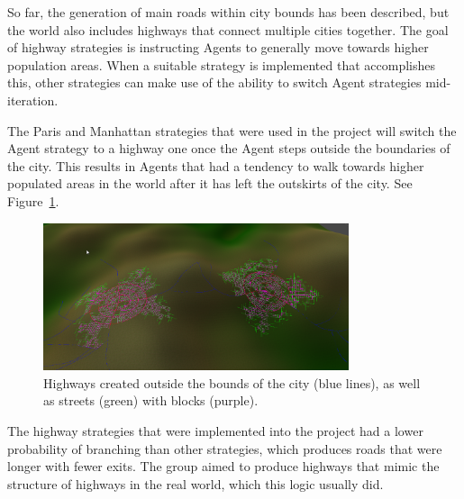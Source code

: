 So far, the generation of main roads within city bounds has been described, but the world also includes highways that connect multiple cities together.
The goal of highway strategies is instructing Agents to generally move towards higher population areas.
When a suitable strategy is implemented that accomplishes this, other strategies can make use of the ability to switch Agent strategies mid-iteration.

The Paris and Manhattan strategies that were used in the project will switch the Agent strategy to a highway one once the Agent steps outside the boundaries of the city.
This results in Agents that had a tendency to walk towards higher populated areas in the world after it has left the outskirts of the city.
See Figure~\ref{fig:road_highways}.

\begin{figure}[H]
  \centering

  \includegraphics[width=0.8\textwidth]{figure/road_highways.png}
  \caption{Highways created outside the bounds of the city (blue lines), as well as streets (green) with blocks (purple).}

  \label{fig:road_highways}
\end{figure}

The highway strategies that were implemented into the project had a lower probability of branching than other strategies, which produces roads that were longer with fewer exits.
The group aimed to produce highways that mimic the structure of highways in the real world, which this logic usually did.
